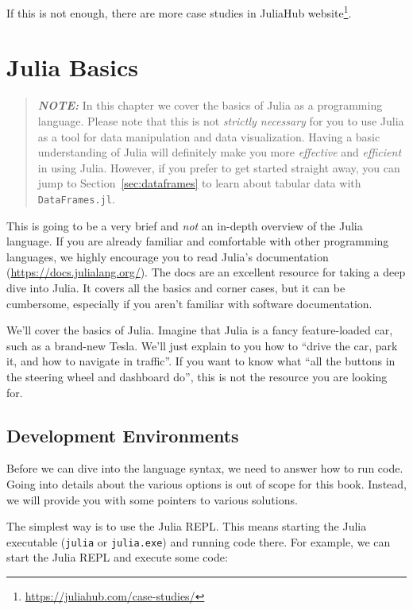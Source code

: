 \documentclass[
  notoc %
]{tufte-book}
\DeclareRobustCommand{\href}[2]{#2\footnote{\url{#1}}}
\newcommand{\passthrough}[1]{#1}
\begin{document}
If this is not enough, there are more case studies in
\href{https://juliahub.com/case-studies/}{JuliaHub website}.

\hypertarget{sec:julia_basics}{%
\chapter{Julia Basics}\label{sec:julia_basics}}

\begin{quote}
\textbf{\emph{NOTE:}} In this chapter we cover the basics of Julia as a
programming language. Please note that this is not \emph{strictly
necessary} for you to use Julia as a tool for data manipulation and data
visualization. Having a basic understanding of Julia will definitely
make you more \emph{effective} and \emph{efficient} in using Julia.
However, if you prefer to get started straight away, you can jump to
Section~\ref{sec:dataframes} to learn about tabular data with
\passthrough{\lstinline!DataFrames.jl!}.
\end{quote}

This is going to be a very brief and \emph{not} an in-depth overview of
the Julia language. If you are already familiar and comfortable with
other programming languages, we highly encourage you to read Julia's
documentation (\url{https://docs.julialang.org/}). The docs are an
excellent resource for taking a deep dive into Julia. It covers all the
basics and corner cases, but it can be cumbersome, especially if you
aren't familiar with software documentation.

We'll cover the basics of Julia. Imagine that Julia is a fancy
feature-loaded car, such as a brand-new Tesla. We'll just explain to you
how to ``drive the car, park it, and how to navigate in traffic''. If
you want to know what ``all the buttons in the steering wheel and
dashboard do'', this is not the resource you are looking for.

\hypertarget{sec:ide}{%
\section{Development Environments}\label{sec:ide}}

Before we can dive into the language syntax, we need to answer how to
run code. Going into details about the various options is out of scope
for this book. Instead, we will provide you with some pointers to
various solutions.

The simplest way is to use the Julia REPL. This means starting the Julia
executable (\passthrough{\lstinline!julia!} or
\passthrough{\lstinline!julia.exe!}) and running code there. For
example, we can start the Julia REPL and execute some code:
\end{document}
